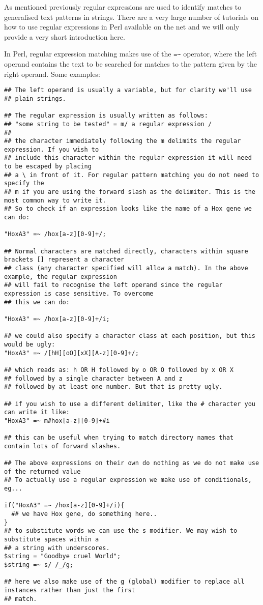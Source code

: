 \documentclass[11pt]{article}
\begin{document}
As mentioned previously regular expressions are used to identify matches
to generalised text patterns in strings. There are a very large number
of tutorials on how to use regular expressions in Perl available on the
net and we will only provide a very short introduction here.

In Perl, regular expression matching makes use of the \texttt{=\textasciitilde{}} operator,
where the left operand contains the text to be searched for matches to the
pattern given by the right operand. Some examples:

\begin{verbatim}
## The left operand is usually a variable, but for clarity we'll use
## plain strings.

## The regular expression is usually written as follows:
## "some string to be tested" = m/ a regular expression /
##
## the character immediately following the m delimits the regular expression. If you wish to
## include this character within the regular expression it will need to be escaped by placing
## a \ in front of it. For regular pattern matching you do not need to specify the
## m if you are using the forward slash as the delimiter. This is the most common way to write it.
## So to check if an expression looks like the name of a Hox gene we can do:

"HoxA3" =~ /hox[a-z][0-9]+/;

## Normal characters are matched directly, characters within square brackets [] represent a character
## class (any character specified will allow a match). In the above example, the regular expression
## will fail to recognise the left operand since the regular expression is case sensitive. To overcome
## this we can do:

"HoxA3" =~ /hox[a-z][0-9]+/i;

## we could also specify a character class at each position, but this would be ugly:
"HoxA3" =~ /[hH][oO][xX][A-z][0-9]+/;

## which reads as: h OR H followed by o OR O followed by x OR X 
## followed by a single character between A and z
## followed by at least one number. But that is pretty ugly.

## if you wish to use a different delimiter, like the # character you can write it like:
"HoxA3" =~ m#hox[a-z][0-9]+#i

## this can be useful when trying to match directory names that contain lots of forward slashes.

## The above expressions on their own do nothing as we do not make use of the returned value
## To actually use a regular expression we make use of conditionals, eg...

if("HoxA3" =~ /hox[a-z][0-9]+/i){
  ## we have Hox gene, do something here..
}
## to substitute words we can use the s modifier. We may wish to substitute spaces within a
## a string with underscores.
$string = "Goodbye cruel World";
$string =~ s/ /_/g;

## here we also make use of the g (global) modifier to replace all instances rather than just the first
## match.
\end{verbatim}
\end{document}
